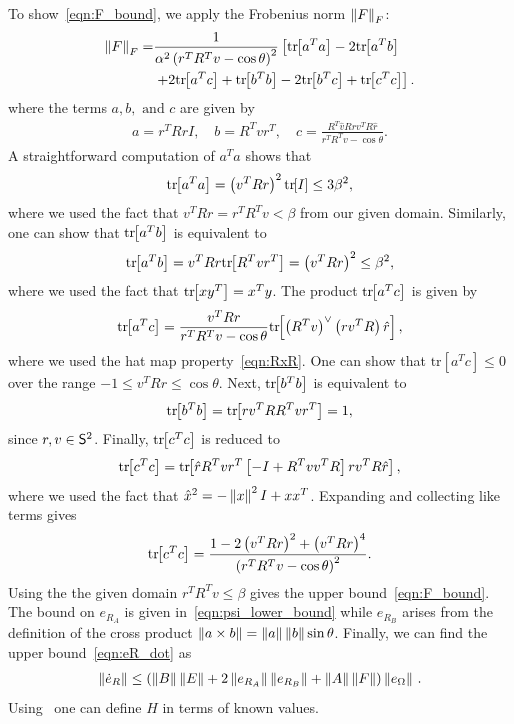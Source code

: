 \documentclass[10pt,fleqn]{IJCAS}  %
\begin{document}
\begin{multicols}{2}
To show~\cref{eqn:F_bound}, we apply the Frobenius norm \( \left\| F \right\|_F \):
\begin{align*}
	\left\| F \right\|_F =& \frac{1}{\alpha ^2 \left( r^T R^T v - \cos \theta \right)^2} \left[\mathrm{tr}\negthickspace\left[ a^T a \right] - 2 \mathrm{tr}\negthickspace\left[ a^T b \right] \right. \\
	&\left.+ 2 \mathrm{tr}\negthickspace\left[ a^T c  \right] + \mathrm{tr}\negthickspace\left[ b^T b \right]  - 2 \mathrm{tr}\negthickspace\left[ b^T c \right] + \mathrm{tr}\negthickspace\left[ c^T c \right]\right] .
\end{align*}
where the terms \( a, b, \text{ and } c \) are given by
\begin{gather*}
	a = r^T R r I , \quad	b = R^T v r^T , \quad c = \frac{R^T \hat{v} R r v^T R \hat{r}}{r^T R^T v - \cos \theta}.
\end{gather*}
A straightforward computation of \( a^T a \) shows that
\begin{gather*}
	\mathrm{tr}\negthickspace\left[ a^T a \right] = \left( v^T R r \right)^2 \mathrm{tr}\negthickspace\left[ I \right] \leq 3 \beta^2 ,
\end{gather*}
where we used the fact that \( v^T R r = r^T R^T v < \beta \) from our given domain.
Similarly, one can show that \( \mathrm{tr}\negthickspace\left[ a^T b \right] \) is equivalent to
\begin{gather*}
	\mathrm{tr}\negthickspace\left[ a^T b \right] = v^T R r \mathrm{tr}\negthickspace\left[ R^T v r^T \right] = \left( v^T R r \right)^2 \leq \beta^2 ,
\end{gather*} 
where we used the fact that \( \mathrm{tr}\negthickspace\left[ x y^T \right] = x^T y \).
The product \( \mathrm{tr}\negthickspace\left[ a^T c \right] \) is given by
\begin{gather*}
	\mathrm{tr}\negthickspace\left[ a^T c \right] = \frac{v^T R r}{r^T R^T v - \cos \theta} \mathrm{tr}\negthickspace\left[ \left( R^T v \right)^\vee \left( r v^T R \right) \hat{r}  \right] ,
\end{gather*}
where we used the hat map property~\cref{eqn:RxR}.
One can show that \(\mathrm{tr}[a^T c] \leq 0 \) over the range \( -1 \leq v^T R r \leq \cos \theta \). 
Next, \( \mathrm{tr}\negthickspace\left[ b^T b \right]\) is equivalent to
\begin{gather*}
	\mathrm{tr}\negthickspace\left[ b^T b \right] = \mathrm{tr}\negthickspace\left[ r v^T R R^T v r^T \right] = 1 ,
\end{gather*}
since \( r,v \in \mathsf{S}^2\).
Finally, \( \mathrm{tr}\negthickspace\left[ c^T c \right] \) is reduced to
\begin{gather*}
	\mathrm{tr}\negthickspace\left[ c^T c \right] = \mathrm{tr}\negthickspace\left[ \hat{r} R^T v r^T \left[ -I + R^T v v^T R \right] r v^T R \hat{r} \right] ,
\end{gather*}
where we used the fact that \( \hat{x}^2 = - \left\| x \right\|^2 I + x x^T\).
Expanding and collecting like terms gives
\begin{gather*}
	\mathrm{tr}\negthickspace\left[ c^T c  \right] = \frac{1 - 2\left( v^T R r \right)^2 + \left( v^T R r \right)^4}{\left( r^T R^T v - \cos \theta \right)^2} . 
\end{gather*}
Using the the given domain \( r^T R^T v \leq \beta \) gives the upper bound~\cref{eqn:F_bound}.
The bound on \( e_{R_A} \) is given in~\cref{eqn:psi_lower_bound} while \( e_{R_B} \) arises from the definition of the cross product \( \left\| a \times b \right\| = \left\| a \right\| \left\| b \right\| \sin \theta \).
Finally, we can find the upper bound~\cref{eqn:eR_dot} as
\begin{gather*}
	\left\| \dot{e}_R \right\| \leq \left( \left\| B \right\| \left\| E \right\| + 2 \left\| e_{R_A} \right\| \left\| e_{R_B} \right\| + \left\| A \right\|\left\| F \right\| \right) \left\| e_\Omega \right\| \, .
\end{gather*}
Using~ one can define \( H \) in terms of known values.


\end{multicols}
\end{document}
